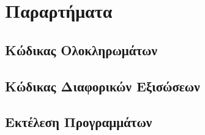 \documentclass[assignment4.tex]{subfiles}
\begin{document}
\section*{Παραρτήματα}
\subsection*{Κώδικας Ολοκληρωμάτων}

\subsection*{Κώδικας Διαφορικών Εξισώσεων}

\subsection*{Εκτέλεση Προγραμμάτων}

\end{document}
